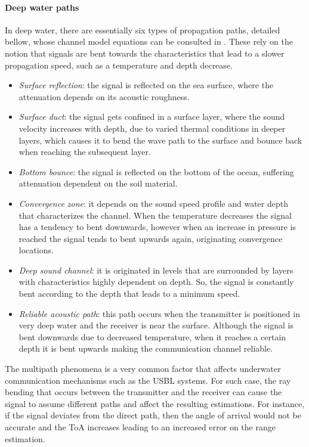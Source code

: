\paragraph{Deep water paths} In deep water, there are essentially six types of propagation paths, detailed bellow, whose channel model equations can be consulted in \cite{multipath-rayleigh-models}. These rely on the notion that signals are bent towards the characteristics that lead to a slower propagation speed, such as a temperature and depth decrease.

\begin{itemize}
	\item \textit{Surface reflection}: the signal is reflected on the sea surface, where the attenuation depends on its acoustic roughness.
	
	\item \textit{Surface duct}: the signal gets confined in a surface layer, where the sound velocity increases with depth, due to varied thermal conditions in deeper layers, which causes it to bend the wave path to the surface and bounce back when reaching the subsequent layer.
	
	\item \textit{Bottom bounce}: the signal is reflected on the bottom of the ocean, suffering attenuation dependent on the soil material.
	
	\item \textit{Convergence zone}: it depends on the sound speed profile and water depth that characterizes the channel. When the temperature decreases the signal has a tendency to bent downwards, however when an increase in pressure is reached the signal tends to bent upwards again, originating convergence locations.
	
	\item \textit{Deep sound channel}: it is originated in levels that are surrounded by layers with characteristics highly dependent on depth. So, the signal is constantly bent according to the depth that leads to a minimum speed. 
	
	\item \textit{Reliable acoustic path}: this path occurs when the transmitter is positioned in very deep water and the receiver is near the surface. Although the signal is bent downwards due to decreased temperature, when it reaches a certain depth it is bent upwards making the communication channel reliable.
\end{itemize}

The multipath phenomena is a very common factor that affects underwater communication mechanisms such as the USBL systems. For such case, the ray bending that occurs between the transmitter and the receiver can cause the signal to assume different paths and affect the resulting estimations. For instance, if the signal deviates from the direct path, then the angle of arrival would not be accurate and the ToA increases leading to an increased error on the range estimation.

